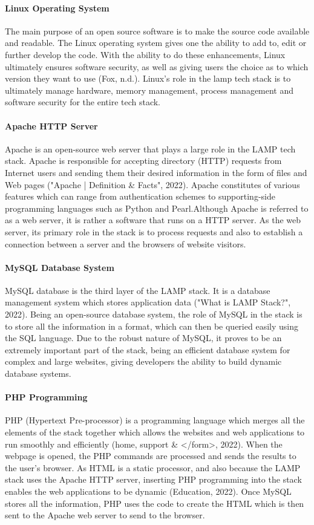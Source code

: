 \documentclass[a4paper, 11pt]{report}
\begin{document}
	\paragraph {Linux Operating System} The main purpose of an open source software is to make the source code available and readable. The Linux operating system gives one the ability to add to, edit or further develop the code. With the ability to do these enhancements, Linux ultimately ensures software security, as well as giving users the choice as to which version they want to use (Fox, n.d.). Linux’s role in the lamp tech stack is to ultimately manage hardware, memory management, process management and software security for the entire tech stack. 
	
	\paragraph {Apache HTTP Server} Apache is an open-source web server that plays a large role in the LAMP tech stack. Apache is responsible for accepting directory (HTTP) requests from Internet users and sending them their desired information in the form of files and Web pages ("Apache | Definition & Facts", 2022). Apache constitutes of various features which can range from authentication schemes to supporting-side programming languages such as Python and Pearl.Although Apache is referred to as a web server, it is rather a software that runs on a HTTP server. As the web server, its primary role in the stack is to process requests and also to establish a connection between a server and the browsers of website visitors. 
	
	\paragraph {MySQL Database System} MySQL database is the third layer of the LAMP stack. It is a database management system which stores application data ("What is LAMP Stack?", 2022). Being an open-source database system, the role of MySQL in the stack is to store all the information in a format, which can then be queried easily using the SQL language. Due to the robust nature of MySQL, it proves to be an extremely important part of the stack, being an efficient database system for complex and large websites, giving developers the ability to build dynamic database systems. 

    \paragraph {PHP Programming} PHP (Hypertext Pre-processor) is a programming language which merges all the elements of the stack together which allows the websites and web applications to run smoothly and efficiently (home, support & </form>, 2022). When the webpage is opened, the PHP commands are processed and sends the results to the user’s browser. As HTML is a static processor, and also because the LAMP stack uses the Apache HTTP server, inserting PHP programming into the stack enables the web applications to be dynamic (Education, 2022). Once MySQL stores all the information, PHP uses the code to create the HTML which is then sent to the Apache web server to send to the browser. 
	
\end{document}
